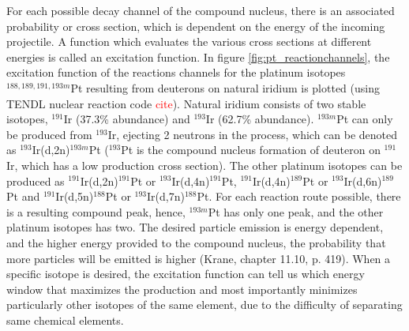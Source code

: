 \noindent For each possible decay channel of the compound nucleus, there is an associated probability or cross section, which is dependent on the energy of the incoming projectile. A function which evaluates the various cross sections at different energies is called an excitation function. In figure \ref{fig:pt_reactionchannels}, the excitation function of the reactions channels for the platinum isotopes $^{188, 189, 191,193m}$Pt resulting from deuterons on natural iridium is plotted (using TENDL nuclear reaction code \textcolor{red}{cite}). Natural iridium consists of two stable isotopes, $^{191}$Ir (37.3\% abundance) and $^{193}$Ir (62.7\% abundance). $^{193m}$Pt can only be produced from $^{193}$Ir, ejecting 2 neutrons in the process, which can be denoted as $^{193}$Ir(d,2n)$^{193m}$Pt ($^{193}$Pt is the compound nucleus formation of deuteron on $^{191}$Ir, which has a low production cross section). The other platinum isotopes can be produced as $^{191}$Ir(d,2n)$^{191}$Pt or $^{193}$Ir(d,4n)$^{191}$Pt, $^{191}$Ir(d,4n)$^{189}$Pt or $^{193}$Ir(d,6n)$^{189}$Pt and $^{191}$Ir(d,5n)$^{188}$Pt or $^{193}$Ir(d,7n)$^{188}$Pt. For each reaction route possible, there is a resulting compound peak, hence, $^{193m}$Pt has only one peak, and the other platinum isotopes has two. The desired particle emission is energy dependent, and the higher energy provided to the compound nucleus, the probability that more particles will be emitted is higher (Krane, chapter 11.10, p. 419). When a specific isotope is desired, the excitation function can tell us which energy window that maximizes the production and most importantly minimizes particularly other isotopes of the same element, due to the difficulty of separating same chemical elements. \\

